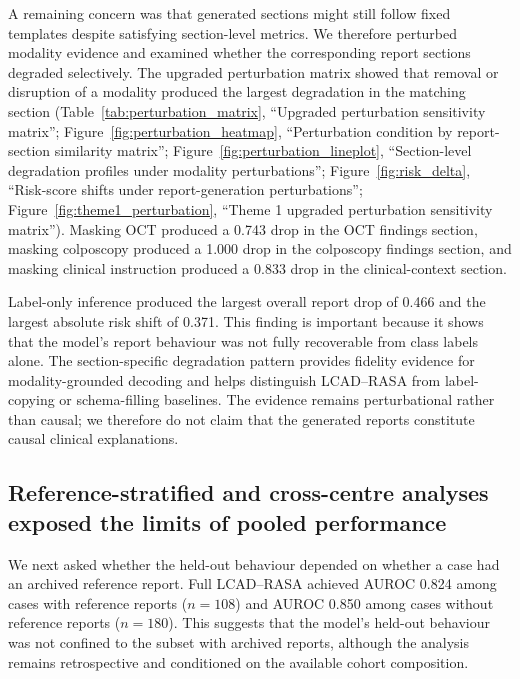 A remaining concern was that generated sections might still follow fixed templates despite satisfying section-level metrics. We therefore perturbed modality evidence and examined whether the corresponding report sections degraded selectively. The upgraded perturbation matrix showed that removal or disruption of a modality produced the largest degradation in the matching section (Table~\ref{tab:perturbation_matrix}, ``Upgraded perturbation sensitivity matrix''; Figure~\ref{fig:perturbation_heatmap}, ``Perturbation condition by report-section similarity matrix''; Figure~\ref{fig:perturbation_lineplot}, ``Section-level degradation profiles under modality perturbations''; Figure~\ref{fig:risk_delta}, ``Risk-score shifts under report-generation perturbations''; Figure~\ref{fig:theme1_perturbation}, ``Theme 1 upgraded perturbation sensitivity matrix''). Masking OCT produced a 0.743 drop in the OCT findings section, masking colposcopy produced a 1.000 drop in the colposcopy findings section, and masking clinical instruction produced a 0.833 drop in the clinical-context section.

Label-only inference produced the largest overall report drop of 0.466 and the largest absolute risk shift of 0.371. This finding is important because it shows that the model's report behaviour was not fully recoverable from class labels alone. The section-specific degradation pattern provides fidelity evidence for modality-grounded decoding and helps distinguish LCAD--RASA from label-copying or schema-filling baselines. The evidence remains perturbational rather than causal; we therefore do not claim that the generated reports constitute causal clinical explanations.

\subsection{Reference-stratified and cross-centre analyses exposed the limits of pooled performance}
\label{subsec:loco_results}

We next asked whether the held-out behaviour depended on whether a case had an archived reference report. Full LCAD--RASA achieved AUROC 0.824 among cases with reference reports ($n=108$) and AUROC 0.850 among cases without reference reports ($n=180$). This suggests that the model's held-out behaviour was not confined to the subset with archived reports, although the analysis remains retrospective and conditioned on the available cohort composition.

